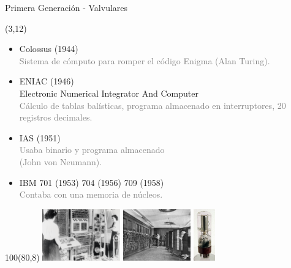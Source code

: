 \documentclass[aspectratio=169]{beamer}
\begin{document}
\begin{frame}[fragile,t]{Primera Generación - Valvulares}
    \begin{textblock}{80}(3,12)
    \begin{itemize}
    \setlength\itemsep{0.2cm}
    \item<1-> Colossus (1944)\\
    \textcolor{gray}{Sistema de cómputo para romper el código Enigma (Alan Turing).}
    \item<2-> ENIAC (1946)\\ {\scriptsize Electronic Numerical Integrator And Computer}\\
    \textcolor{gray}{Cálculo de tablas balísticas, programa almacenado en interruptores, 20 registros decimales.}
    \item<3-> IAS (1951)\\
    \textcolor{gray}{Usaba binario y programa almacenado\\ (John von Neumann).}
    \item<4-> IBM 701 (1953) 704 (1956) 709 (1958)\\
    \textcolor{gray}{Contaba con una memoria de núcleos.}
    \end{itemize}
    \end{textblock}
    \begin{textblock}{100}(80,8)
    \includegraphics[height=2.23cm]{img/Colossus.jpg} \hspace{0.1cm} \includegraphics[height=2.23cm]{img/Eniac.jpg}
    \hspace{0.1cm} \includegraphics[height=2.23cm]{img/valve.jpg}\\
    \vspace{0.1cm}

\end{textblock}
\end{frame}
\end{document}
